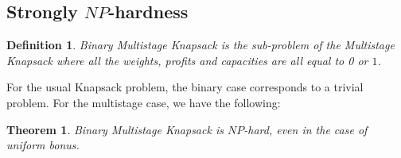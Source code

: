 \documentclass[a4paper]{book}
\newtheorem{theorem}{Theorem}[chapter]
\newtheorem{definition}{Definition}
\begin{document}

\subsection{Strongly $NP$-hardness}\label{sec:strong}

\begin{definition}
{\sc Binary Multistage  Knapsack}  is the sub-problem of the Multistage {\sc Knapsack} where all the weights, profits and capacities are all equal to 0 or $1$.
\end{definition}


For the usual {\sc Knapsack} problem, the binary case corresponds to a trivial problem. For the multistage case, we have the following: 

\begin{theorem}
{\sc Binary Multistage  Knapsack} is $NP$-hard, even in the case of uniform bonus.
\end{theorem}
\end{document}
